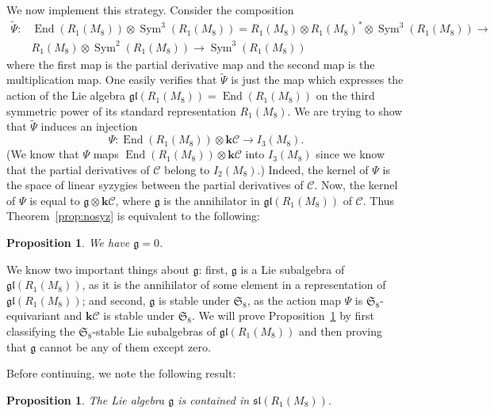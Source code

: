 \documentclass{amsart}
\newtheorem{proposition}[theorem]{Proposition}
\theoremstyle{definition}
\theoremstyle{remark}
\DeclareMathOperator{\Sym}{Sym}
\DeclareMathOperator{\End}{End}
\def\SS{\mathfrak{S}}
\def\fieldk{\mathbf{k}}
\def\wt{\mathbf{wt}}
\def\cubic{\mathcal{C}}
\let\mf\mathfrak
\let\wt\widetilde
\begin{document}
We now implement this strategy.  Consider the composition
\begin{displaymath}
\begin{split}
\wt{\Psi}:& \End(R_1(M_8)) \otimes \Sym^3(R_1(M_8)) = R_1(M_8) \otimes
R_1(M_8)^* \otimes \Sym^3(R_1(M_8)) \to \\
& R_1(M_8) \otimes \Sym^2(R_1(M_8)) \to \Sym^3(R_1(M_8))
\end{split}
\end{displaymath}
where the first map is the partial derivative map and the second map is the multiplication map.  One easily verifies
that $\wt{\Psi}$ is just the map which expresses the action of the Lie algebra $\mf{gl}(R_1(M_8))=\End(R_1(M_8))$ on the
third symmetric power of its standard representation $R_1(M_8)$.  We are trying to show that $\wt{\Psi}$ induces an
injection
\begin{displaymath}
\Psi:\End(R_1(M_8)) \otimes \fieldk \cubic \to I_3(M_8).
\end{displaymath}
(We know that $\Psi$ maps $\End(R_1(M_8)) \otimes \fieldk \cubic$ into $I_3(M_8)$ since we know that the partial
derivatives of $\cubic$ belong to $I_2(M_8)$.)  Indeed, the kernel of $\Psi$ is the space of linear syzygies between the
partial derivatives of $\cubic$.  Now, the kernel of $\Psi$ is equal to $\mf{g} \otimes \fieldk \cubic$, where $\mf{g}$
is the annihilator in $\mf{gl}(R_1(M_8))$ of $\cubic$.  Thus Theorem~\ref{prop:nosyz} is equivalent to the following:

\begin{proposition}
\label{prop:l-zero}
We have $\mf{g}=0$.
\end{proposition}

We know two important things about $\mf{g}$:  first, $\mf{g}$ is a Lie subalgebra of $\mf{gl}(R_1(M_8))$, as it is the
annihilator of some element in a representation of $\mf{gl}(R_1(M_8))$; and second, $\mf{g}$ is stable under $\SS_8$,
as the action map $\Psi$ is $\SS_8$-equivariant and $\fieldk \cubic$ is stable under $\SS_8$.  We will prove
Proposition~\ref{prop:l-zero} by first classifying the $\SS_8$-stable Lie subalgebras of $\mf{gl}(R_1(M_8))$ and then
proving that $\mf{g}$ cannot be any of them except zero.

Before continuing, we note the following result:

\begin{proposition}
The Lie algebra $\mf{g}$ is contained in $\mf{sl}(R_1(M_8))$.
\end{proposition}
\end{document}
